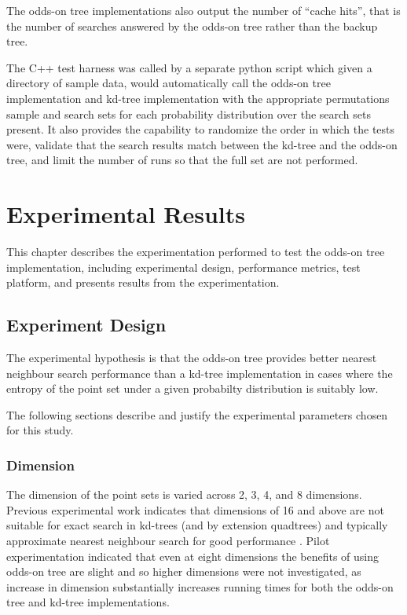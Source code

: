 \documentclass[mcs]{scsthesis}
\begin{document}
The odds-on tree implementations also output the number of ``cache hits'', that
is the number of searches answered by the odds-on tree rather than the backup
tree.

The C++ test harness was called by a separate python script which given a
directory of sample data, would automatically call the odds-on tree
implementation and kd-tree implementation with the appropriate permutations
sample and search sets for each probability distribution over the search sets
present. It also provides the capability to randomize the order in which the
tests were, validate that the search results match between the kd-tree and the
odds-on tree, and limit the number of runs so that the full set are not
performed.

\chapter{Experimental Results}

This chapter describes the experimentation performed to test the odds-on tree
implementation, including experimental design, performance metrics, test
platform, and presents results from the experimentation.

\section{Experiment Design}

The experimental hypothesis is that the odds-on tree provides better nearest
neighbour search performance than a kd-tree implementation in cases where the
entropy of the point set under a given probabilty distribution is suitably low.

The following sections describe and justify the experimental parameters chosen
for this study.

\subsection{Dimension}

The dimension of the point sets is varied across 2, 3, 4, and 8 dimensions.
Previous experimental work indicates that dimensions of 16 and above are not
suitable for exact search in kd-trees (and by extension quadtrees) and typically 
approximate nearest neighbour search for good performance \cite{app-ann}. Pilot 
experimentation indicated that even at eight dimensions the benefits of using
odds-on tree are slight and so higher dimensions were not investigated, as
increase in dimension substantially increases running times for both the
odds-on tree and kd-tree implementations.
\end{document}
